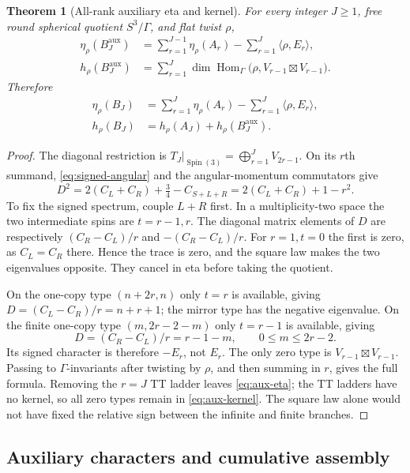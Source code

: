 \documentclass[11pt]{article}
\newtheorem{theorem}{Theorem}[section]
\theoremstyle{definition}
\newcommand{\etaInv}{\eta}
\newcommand{\Hom}{\operatorname{Hom}}
\newcommand{\Spin}{\operatorname{Spin}}
\newcommand{\aux}{\mathrm{aux}}
\begin{document}
\begin{theorem}[All-rank auxiliary eta and kernel]
For every integer $J\geq1$, free round spherical quotient $S^3/\Gamma$, and
flat twist $\rho$,
\begin{align}
 \etaInv_\rho(B_J^{\aux})
 &=\sum_{r=1}^{J-1}\etaInv_\rho(A_r)
   -\sum_{r=1}^{J}\langle\rho,E_r\rangle,\label{eq:aux-eta}\\
 h_\rho(B_J^{\aux})
 &=\sum_{r=1}^{J}
 \dim\Hom_\Gamma
 \bigl(\rho,V_{r-1}\boxtimes V_{r-1}\bigr).\label{eq:aux-kernel}
\end{align}
Therefore
\begin{align}
 \etaInv_\rho(B_J)
 &=\sum_{r=1}^{J}\etaInv_\rho(A_r)
   -\sum_{r=1}^{J}\langle\rho,E_r\rangle,\label{eq:full-eta}\\
 h_\rho(B_J)&=h_\rho(A_J)+h_\rho(B_J^{\aux}).\label{eq:full-kernel}
\end{align}
\end{theorem}

\begin{proof}
The diagonal restriction is
$T_J|_{\Spin(3)}=\bigoplus_{r=1}^J V_{2r-1}$.  On its $r$th summand,
\eqref{eq:signed-angular} and the angular-momentum commutators give
\[
 D^2=2(C_L+C_R)+\tfrac34-C_{S+L+R}
     =2(C_L+C_R)+1-r^2.
\]
To fix the signed spectrum, couple $L+R$ first.  In a multiplicity-two
space the two intermediate spins are $t=r-1,r$.  The diagonal matrix elements
of $D$ are respectively $(C_R-C_L)/r$ and $-(C_R-C_L)/r$.
For $r=1,t=0$ the first is zero, as $C_L=C_R$ there.  Hence the trace is
zero, and the square law makes the two eigenvalues opposite.  They cancel
in eta before taking the quotient.

On the one-copy type $(n+2r,n)$ only $t=r$ is available, giving
$D=(C_L-C_R)/r=n+r+1$; the mirror type has the negative eigenvalue.
On the finite one-copy type $(m,2r-2-m)$ only $t=r-1$ is available, giving
\[
 D=(C_R-C_L)/r=r-1-m,\qquad 0\leq m\leq2r-2.
\]
Its signed character is therefore $-E_r$, not $E_r$.  The only zero type is
$V_{r-1}\boxtimes V_{r-1}$.  Passing to $\Gamma$-invariants after twisting by
$\rho$, and then summing in $r$, gives
the full formula.  Removing the $r=J$ TT ladder leaves
\eqref{eq:aux-eta}; the TT ladders have no kernel, so all zero types remain
in \eqref{eq:aux-kernel}.  The square law alone would not have fixed the
relative sign between the infinite and finite branches.
\end{proof}

\subsection{Auxiliary characters and cumulative assembly}
\end{document}

